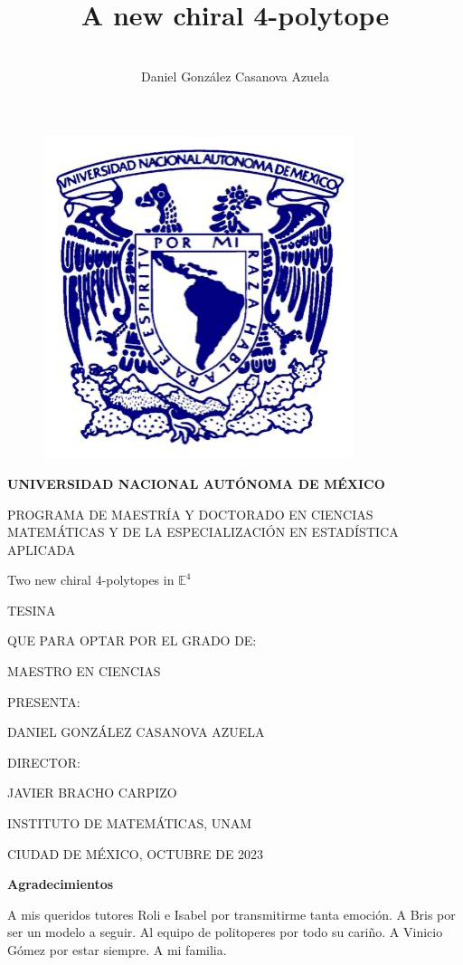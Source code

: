 \documentclass{article}
\title{A new chiral 4-polytope}
\author{\\Daniel González Casanova Azuela}
\date{}
\theoremstyle{definition}
\newcommand{\E}{\mathbb{E}}
\begin{document}
\thispagestyle{empty}
\begin{figure}[H]
	\centering
	\includegraphics[width=0.3\linewidth]{fig0}
\end{figure}

\begin{center}
	\textbf{UNIVERSIDAD NACIONAL AUTÓNOMA DE MÉXICO}
	
	PROGRAMA DE MAESTRÍA Y DOCTORADO EN CIENCIAS MATEMÁTICAS Y DE LA ESPECIALIZACIÓN EN ESTADÍSTICA APLICADA
	
	\vspace{2cm}
	{\Large Two new chiral 4-polytopes in $\E^4$}
	\vspace{1.2cm}
	
	TESINA
	
	QUE PARA OPTAR POR EL GRADO DE:
	
	MAESTRO EN CIENCIAS
	\vspace{1.2cm}
	
	PRESENTA:
	
	DANIEL GONZÁLEZ CASANOVA AZUELA
	\vspace{1.2cm}
	
	DIRECTOR:
	
	JAVIER BRACHO CARPIZO
	
	INSTITUTO DE MATEMÁTICAS, UNAM
	\vspace{1.2cm}
	
	CIUDAD DE MÉXICO, OCTUBRE DE 2023
\end{center}

\clearpage

\begin{changemargin}{3.3cm}{0cm} 

\vspace*{4cm}

{\Large\textbf{Agradecimientos}}
\vspace{1cm}

A mis queridos tutores Roli e Isabel por transmitirme tanta emoción. A Bris por ser un modelo a seguir. Al equipo de politoperes por todo su cariño. A Vinicio Gómez por estar siempre. A mi familia.
\end{changemargin}
\clearpage
	
\end{document}
